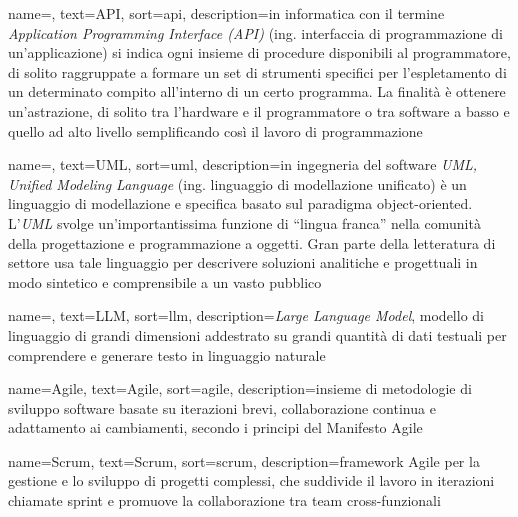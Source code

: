 




 {
    name=,
    text=API,
    sort=api,
    description={in informatica con il termine \emph{Application Programming Interface (API)} (ing. interfaccia di programmazione di un'applicazione) si indica ogni insieme di procedure disponibili al programmatore, di solito raggruppate a formare un set di strumenti specifici per l'espletamento di un determinato compito all'interno di un certo programma. La finalità è ottenere un'astrazione, di solito tra l'hardware e il programmatore o tra software a basso e quello ad alto livello semplificando così il lavoro di programmazione}
}

 {
    name=,
    text=UML,
    sort=uml,
    description={in ingegneria del software \emph{UML, Unified Modeling Language} (ing. linguaggio di modellazione unificato) è un linguaggio di modellazione e specifica basato sul paradigma object-oriented. L'\emph{UML} svolge un'importantissima funzione di ``lingua franca'' nella comunità della progettazione e programmazione a oggetti. Gran parte della letteratura di settore usa tale linguaggio per descrivere soluzioni analitiche e progettuali in modo sintetico e comprensibile a un vasto pubblico}
}

 {
    name=,
    text=LLM,
    sort=llm,
    description={\emph{Large Language Model}, modello di linguaggio di grandi dimensioni addestrato su grandi quantità di dati testuali per comprendere e generare testo in linguaggio naturale}
}

 {
    name=Agile,
    text=Agile,
    sort=agile,
    description={insieme di metodologie di sviluppo software basate su iterazioni brevi, collaborazione continua e adattamento ai cambiamenti, secondo i principi del Manifesto Agile}
}

 {
    name=Scrum,
    text=Scrum,
    sort=scrum,
    description={framework Agile per la gestione e lo sviluppo di progetti complessi, che suddivide il lavoro in iterazioni chiamate sprint e promuove la collaborazione tra team cross-funzionali}
}

